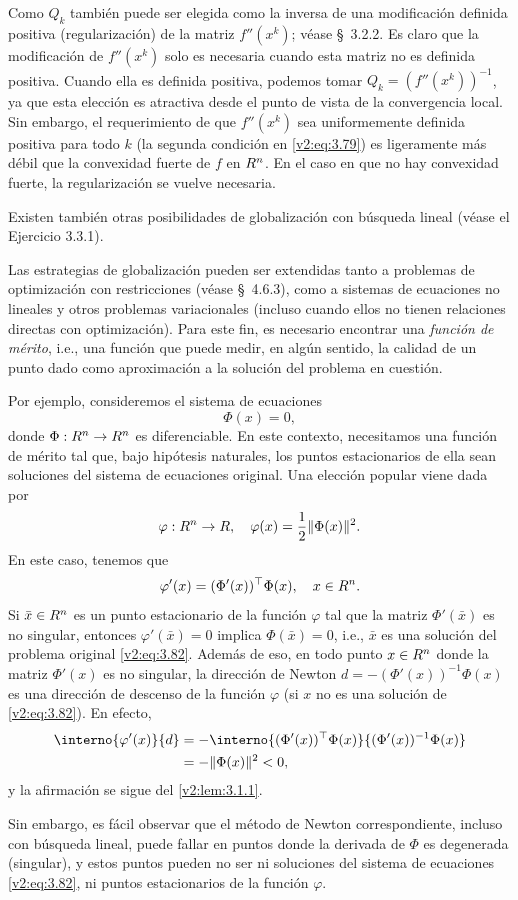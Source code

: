 Como $Q_k$ también puede ser elegida como la inversa de una modificación definida positiva (regularización) de la matriz $f''(x^k)$; véase \S~3.2.2. Es claro que la modificación de $f''(x^k)$ solo es necesaria cuando esta matriz no es definida positiva. Cuando ella es definida positiva, podemos tomar $Q_k = (f''(x^k))^{-1}$, ya que esta elección es atractiva desde el punto de vista de la convergencia local. Sin embargo, el requerimiento de que $f''(x^k)$ sea uniformemente definida positiva para todo $k$ (la segunda condición en \eqref{v2:eq:3.79}) es ligeramente más débil que la convexidad fuerte de $f$ en $R^n$. En el caso en que no hay convexidad fuerte, la regularización se vuelve necesaria.

Existen también otras posibilidades de globalización con búsqueda lineal (véase el Ejercicio 3.3.1). 

Las estrategias de globalización pueden ser extendidas tanto a problemas de optimización con restricciones (véase \S~4.6.3), como a sistemas de ecuaciones no lineales y otros problemas variacionales (incluso cuando ellos no tienen relaciones directas con optimización). Para este fin, es necesario encontrar una \textit{función de mérito}, i.e., una función que puede medir, en algún sentido, la calidad de un punto dado como aproximación a la solución del problema en cuestión.

Por ejemplo, consideremos el sistema de ecuaciones
\begin{equation}
    \Phi(x) = 0,
    \label{v2:eq:3.82}
\end{equation}
donde $\Phi : R^n \to R^n$ es diferenciable. En este contexto, necesitamos una función de mérito tal que, bajo hipótesis naturales, los puntos estacionarios de ella sean soluciones del sistema de ecuaciones original. Una elección popular viene dada por
\[
    \varphi : R^n \to R, \quad \varphi(x) = \frac{1}{2}\|\Phi(x)\|^2.
\]
En este caso, tenemos que
\[
    \varphi'(x) = (\Phi'(x))^\top \Phi(x), \quad x \in R^n.
\]
Si $\bar{x} \in R^n$ es un punto estacionario de la función $\varphi$ tal que la matriz $\Phi'(\bar{x})$ es no singular, entonces $\varphi'(\bar{x}) = 0$ implica $\Phi(\bar{x}) = 0$, i.e., $\bar{x}$ es una solución del problema original \eqref{v2:eq:3.82}. Además de eso, en todo punto $x \in R^n$ donde la matriz $\Phi'(x)$ es no singular, la dirección de Newton $d = -(\Phi'(x))^{-1}\Phi(x)$ es una dirección de descenso de la función $\varphi$ (si $x$ no es una solución de \eqref{v2:eq:3.82}). En efecto,
\begin{align*}
    \interno{\varphi'(x)}{d} &= -\interno{(\Phi'(x))^\top \Phi(x)}{(\Phi'(x))^{-1}\Phi(x)} \\
    &= -\|\Phi(x)\|^2 < 0,
\end{align*}
y la afirmación se sigue del \cref{v2:lem:3.1.1}.

Sin embargo, es fácil observar que el método de Newton correspondiente, incluso con búsqueda lineal, puede fallar en puntos donde la derivada de $\Phi$ es degenerada (singular), y estos puntos pueden no ser ni soluciones del sistema de ecuaciones \eqref{v2:eq:3.82}, ni puntos estacionarios de la función $\varphi$.
